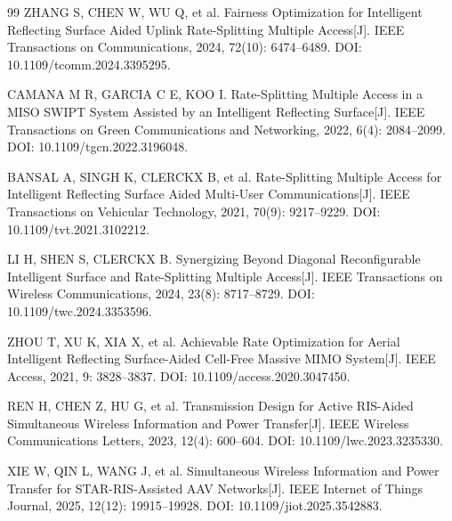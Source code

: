 \begin{thebibliography}{99}
 ZHANG S, CHEN W, WU Q, et al. Fairness Optimization for Intelligent Reflecting Surface Aided Uplink Rate-Splitting Multiple Access[J]. IEEE Transactions on Communications, 2024, 72(10): 6474--6489. DOI: 10.1109/tcomm.2024.3395295.

 CAMANA M R, GARCIA C E, KOO I. Rate-Splitting Multiple Access in a MISO SWIPT System Assisted by an Intelligent Reflecting Surface[J]. IEEE Transactions on Green Communications and Networking, 2022, 6(4): 2084--2099. DOI: 10.1109/tgcn.2022.3196048.

 BANSAL A, SINGH K, CLERCKX B, et al. Rate-Splitting Multiple Access for Intelligent Reflecting Surface Aided Multi-User Communications[J]. IEEE Transactions on Vehicular Technology, 2021, 70(9): 9217--9229. DOI: 10.1109/tvt.2021.3102212.

 LI H, SHEN S, CLERCKX B. Synergizing Beyond Diagonal Reconfigurable Intelligent Surface and Rate-Splitting Multiple Access[J]. IEEE Transactions on Wireless Communications, 2024, 23(8): 8717--8729. DOI: 10.1109/twc.2024.3353596.

 ZHOU T, XU K, XIA X, et al. Achievable Rate Optimization for Aerial Intelligent Reflecting Surface-Aided Cell-Free Massive MIMO System[J]. IEEE Access, 2021, 9: 3828--3837. DOI: 10.1109/access.2020.3047450.

 REN H, CHEN Z, HU G, et al. Transmission Design for Active RIS-Aided Simultaneous Wireless Information and Power Transfer[J]. IEEE Wireless Communications Letters, 2023, 12(4): 600--604. DOI: 10.1109/lwc.2023.3235330.

 XIE W, QIN L, WANG J, et al. Simultaneous Wireless Information and Power Transfer for STAR-RIS-Assisted AAV Networks[J]. IEEE Internet of Things Journal, 2025, 12(12): 19915--19928. DOI: 10.1109/jiot.2025.3542883.

\end{thebibliography}

